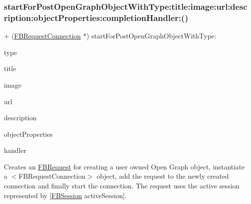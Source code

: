 \subsubsection{\texorpdfstring{start\+For\+Post\+Open\+Graph\+Object\+With\+Type\+:title\+:image\+:url\+:description\+:object\+Properties\+:completion\+Handler\+:()}{startForPostOpenGraphObjectWithType:title:image:url:description:objectProperties:completionHandler:()}\hspace{0.1cm}{\footnotesize\ttfamily [2/5]}}
{\footnotesize\ttfamily + (\hyperlink{interfaceFBRequestConnection}{F\+B\+Request\+Connection} $\ast$) start\+For\+Post\+Open\+Graph\+Object\+With\+Type\+: \begin{DoxyParamCaption}\item[{(N\+S\+String $\ast$)}]{type }\item[{title:(N\+S\+String $\ast$)}]{title }\item[{image:(id)}]{image }\item[{url:(id)}]{url }\item[{description:(N\+S\+String $\ast$)}]{description }\item[{objectProperties:(N\+S\+Dictionary $\ast$)}]{object\+Properties }\item[{completionHandler:(F\+B\+Request\+Handler)}]{handler }\end{DoxyParamCaption}}

Creates an {\ttfamily \hyperlink{interfaceFBRequest}{F\+B\+Request}} for creating a user owned Open Graph object, instantiate a $<$\+F\+B\+Request\+Connection$>$ object, add the request to the newly created connection and finally start the connection. The request uses the active session represented by {\ttfamily \mbox{[}\hyperlink{interfaceFBSession}{F\+B\+Session} active\+Session\mbox{]}}.


